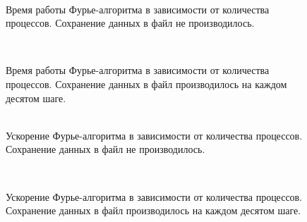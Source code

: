     \begin{figure}[h!]
        \begin{center}
            \begin{minipage}{0.48\linewidth}
                 \\
                \caption{Время работы Фурье-алгоритма в зависимости от количества процессов. Сохранение данных в файл не производилось.}
                \label{gr:TimeFourierNosave}
            \end{minipage}
            \hfill
            \begin{minipage}{0.48\linewidth}
                 \\
                \caption{Время работы Фурье-алгоритма в зависимости от количества процессов. Сохранение данных в файл производилось на каждом десятом шаге.}
                \label{gr:TimeFourierSave}
            \end{minipage}
        \end{center}
    \end{figure}

    \begin{figure}[h!]
        \begin{center}
            \begin{minipage}{0.48\linewidth}
                 \\
                \caption{Ускорение Фурье-алгоритма в зависимости от количества процессов. Сохранение данных в файл не производилось.}
                \label{gr:SpeedupFourierNosave}
            \end{minipage}
            \hfill
            \begin{minipage}{0.48\linewidth}
                 \\
                \caption{Ускорение Фурье-алгоритма в зависимости от количества процессов. Сохранение данных в файл производилось на каждом десятом шаге.}
                \label{gr:SpeedupFourierSave}
            \end{minipage}
        \end{center}
    \end{figure}


